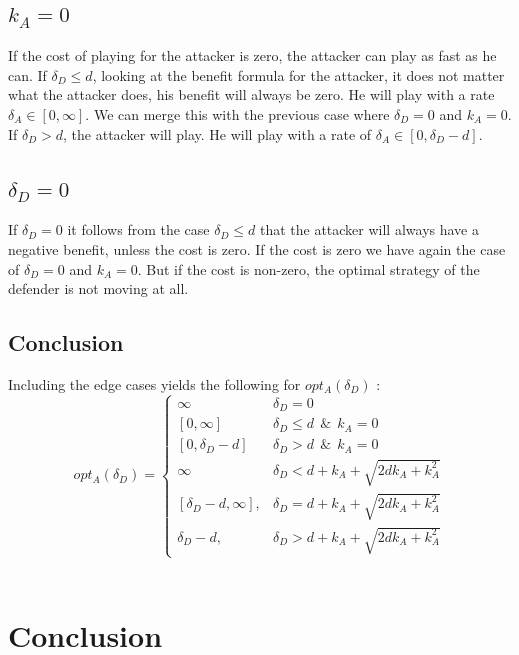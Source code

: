 \subsection*{$k_{A}=0$}
If the cost of playing for the attacker is zero, the attacker can play as fast as he can.  If $\delta_{D} \leq d$, looking at the benefit formula for the attacker, it does not matter what the attacker does, his benefit will always be zero. He will play with a rate $\delta_{A} \in [0,\infty ]$.  We can merge this with the previous case where $\delta_{D}=0$ and $k_{A}=0$.  If $\delta_{D} > d$, the attacker will play. He will play with a rate of $\delta_{A} \in [0, \delta_{D} - d ]$. 
\subsection*{$\delta_{D}=0$}
If $\delta_{D}=0$ it follows from the case $\delta_{D} \leq d$ that the attacker will always have a negative benefit, unless the cost is zero. If the cost is zero we have again the case of $\delta_{D}=0$ and $k_{A}=0$. But if the cost is non-zero, the optimal strategy of the defender is not moving at all. 

\subsection{Conclusion}
Including the edge cases yields the following for $opt_{A}(\delta_{D})$ : \\

 \begin{displaymath}
  opt_{A}(\delta_{D}) = \left\{
     \begin{array}{lr}
     \infty & \delta_{D} = 0 \\
     \left[0,\infty\right] & \delta_{D} \leq d ~~\& ~~k_{A}=0 \\
          \left[0,\delta_{D} - d\right] & \delta_{D} > d ~~\& ~~k_{A}=0 \\
            \infty & \delta_{D} < d+k_{A} + \sqrt{2dk_{A}+k_{A}^{2}} \\
       \left[ \delta_{D}-d, \infty\right],  & \delta_{D} = d+k_{A} + \sqrt{2dk_{A}+k_{A}^{2}} \\
    	\delta_{D}-d, & \delta_{D} > d+k_{A} + \sqrt{2dk_{A}+k_{A}^{2}}
     \end{array}
   \right.
\end{displaymath}
\\

\section{Conclusion}

